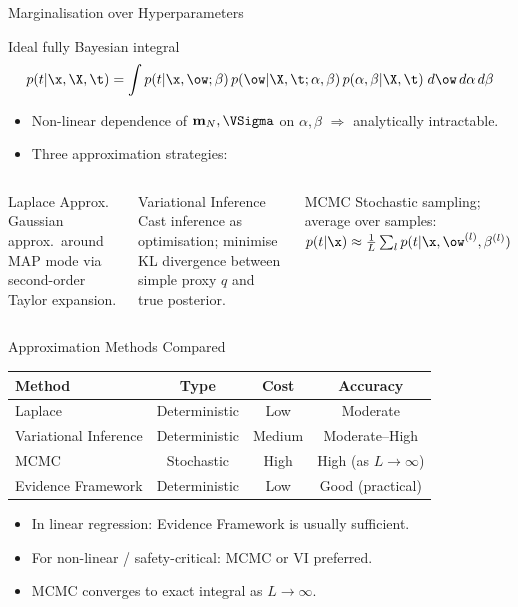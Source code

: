 \begin{frame}{Marginalisation over Hyperparameters}
  \begin{block}{Ideal fully Bayesian integral}
    \[
      p(t|\x,\X,\t) = \int p(t|\x,\ow;\beta)\,p(\ow|\X,\t;\alpha,\beta)\,p(\alpha,\beta|\X,\t)\;d\ow\,d\alpha\,d\beta
    \]
  \end{block}
  \begin{itemize}
    \item Non-linear dependence of $\mathbf{m}_N,\VSigma$ on $\alpha,\beta$ $\Rightarrow$ \alert{analytically intractable}.
    \item Three approximation strategies:
  \end{itemize}
  \vspace{.3em}
  \begin{columns}[T]
  \begin{block}{Laplace Approx.}
    Gaussian approx.\ around MAP mode via second-order Taylor expansion.
  \end{block}
  \begin{block}{Variational Inference}
    Cast inference as optimisation; minimise KL divergence between simple proxy $q$ and true posterior.
  \end{block}
  \begin{block}{MCMC}
    Stochastic sampling; average over samples:
    $p(t|\x)\approx\frac{1}{L}\sum_l p(t|\x,\ow^{(l)},\beta^{(l)})$
  \end{block}
  \end{columns}
\end{frame}

\begin{frame}{Approximation Methods Compared}
  \begin{center}
  \begin{tabular}{lccc}
  \toprule
  \textbf{Method} & \textbf{Type} & \textbf{Cost} & \textbf{Accuracy}\\
  \midrule
  Laplace & Deterministic & Low & Moderate\\
  Variational Inference & Deterministic & Medium & Moderate–High\\
  MCMC & Stochastic & High & High (as $L\to\infty$)\\
  Evidence Framework & Deterministic & Low & Good (practical)\\
  \bottomrule
  \end{tabular}
  \end{center}
  \vspace{.4em}
  \begin{itemize}
    \item In linear regression: \alert{Evidence Framework} is usually sufficient.
    \item For non-linear / safety-critical: MCMC or VI preferred.
    \item MCMC converges to exact integral as $L\to\infty$.
  \end{itemize}
\end{frame}

